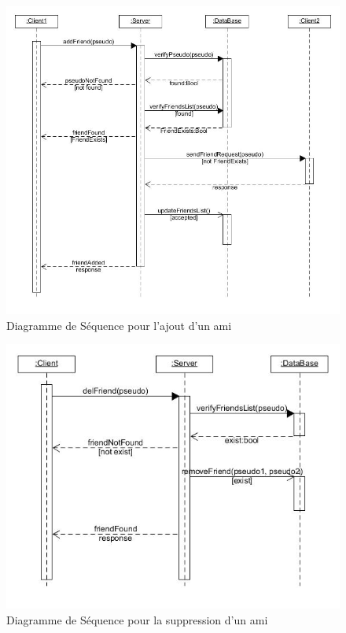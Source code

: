 \documentclass[a4paper,12pt]{article}
\begin{document}
\newpage
\begin{figure}[hbtp]
\centering
\includegraphics[scale=0.5]{images/add_friend.jpg}
\caption{Diagramme de Séquence pour l'ajout d'un ami }
\end{figure}

\begin{figure}[hbtp]
\centering
\includegraphics[scale=0.5]{images/del_friend.jpg}
\caption{Diagramme de Séquence pour la suppression d'un ami }
\end{figure}
\end{document}
